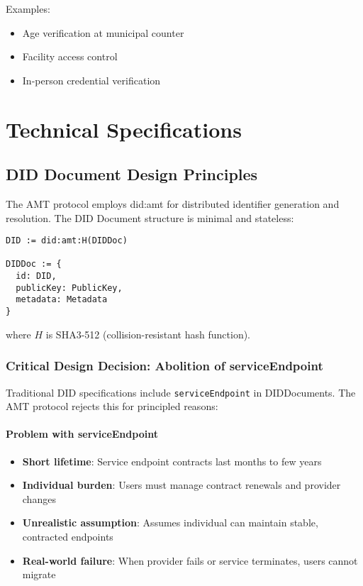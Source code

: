 Examples:
\begin{itemize}
  \item Age verification at municipal counter
  \item Facility access control
  \item In-person credential verification
\end{itemize}

\chapter{Technical Specifications}

\section{DID Document Design Principles}

The AMT protocol employs did:amt for distributed identifier generation and resolution. The DID Document structure is minimal and stateless:

\begin{verbatim}
DID := did:amt:H(DIDDoc)

DIDDoc := {
  id: DID,
  publicKey: PublicKey,
  metadata: Metadata
}
\end{verbatim}

where $H$ is SHA3-512 (collision-resistant hash function).

\subsection{Critical Design Decision: Abolition of serviceEndpoint}

Traditional DID specifications include \texttt{serviceEndpoint} in DIDDocuments. The AMT protocol rejects this for principled reasons:

\subsubsection{Problem with serviceEndpoint}

\begin{itemize}
  \item \textbf{Short lifetime}: Service endpoint contracts last months to few years
  \item \textbf{Individual burden}: Users must manage contract renewals and provider changes
  \item \textbf{Unrealistic assumption}: Assumes individual can maintain stable, contracted endpoints
  \item \textbf{Real-world failure}: When provider fails or service terminates, users cannot migrate
\end{itemize}

